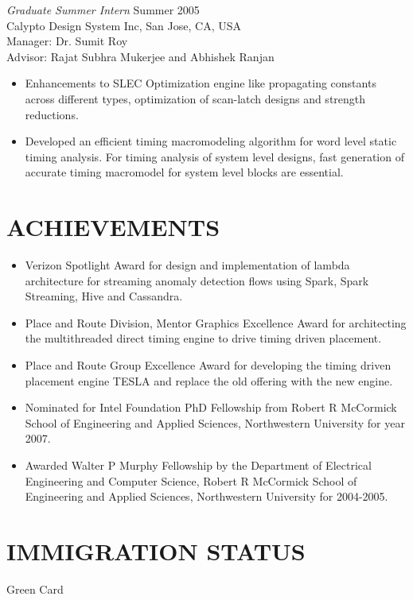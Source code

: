 \documentclass[margin]{res}
\begin{document}
\begin{resume}
{\sl Graduate Summer Intern} \hfill Summer 2005\\
Calypto Design System Inc, San Jose, CA, USA\\
Manager: Dr. Sumit Roy\\
Advisor: Rajat Subhra Mukerjee and Abhishek Ranjan
\begin{itemize} \itemsep -2pt
\item Enhancements to SLEC Optimization engine like propagating constants across different types, 
  optimization of scan-latch designs and strength reductions.
\item Developed an efficient timing macromodeling algorithm for word level static timing analysis.
  For timing analysis of system level designs, fast generation of accurate timing macromodel 
  for system level blocks are essential. 
\end{itemize}


\section{ACHIEVEMENTS}
\begin{itemize} \itemsep -2pt
\item Verizon Spotlight Award for design and implementation of lambda architecture for streaming anomaly detection flows using Spark, Spark Streaming, Hive and Cassandra.
\item Place and Route Division, Mentor Graphics Excellence Award for architecting the multithreaded direct timing engine to drive timing driven placement.
\item Place and Route Group Excellence Award for developing the timing driven placement engine TESLA and replace the old offering with the new engine.  
\item Nominated for Intel Foundation PhD Fellowship from Robert R McCormick School of Engineering and Applied Sciences, Northwestern University for year 2007.
\item Awarded Walter P Murphy Fellowship by the Department of Electrical Engineering and Computer Science, Robert R McCormick School of Engineering and Applied 
  Sciences, Northwestern University for 2004-2005.
\end{itemize}

\section{IMMIGRATION STATUS}
Green Card


\end{resume}
\end{document}
